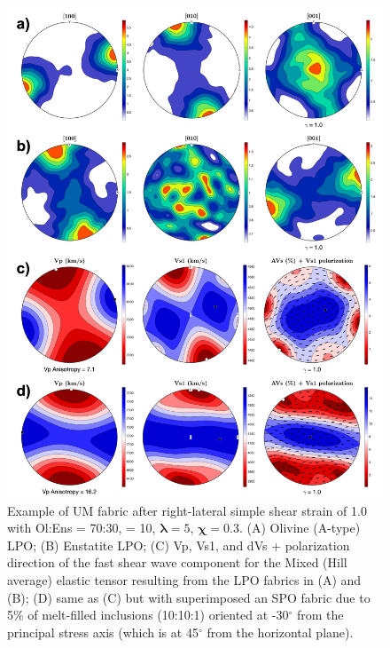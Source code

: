 \begin{figure}[ht]
    \centering
    \includegraphics[width=1.0\textwidth]{DREX_S/Atype_summary_manual.png}
    \caption{Example of UM fabric after right-lateral simple shear strain of 1.0 with Ol:Ens = 70:30,  = 10, $\pmb{\lambda}=5$, $\pmb{\chi}=0.3$. (A) Olivine (A-type) LPO; (B) Enstatite LPO; (C) Vp, Vs1, and dVs + polarization direction of the fast shear wave component for the Mixed (Hill average) elastic tensor  resulting from the LPO fabrics in (A) and (B); (D) same as (C) but with superimposed an SPO fabric due to 5\% of melt-filled inclusions (10:10:1) oriented at -30$^{\circ}$ from the principal stress axis (which is at 45$^{\circ}$ from the horizontal plane).}
    \label{fig:atype}
\end{figure}

